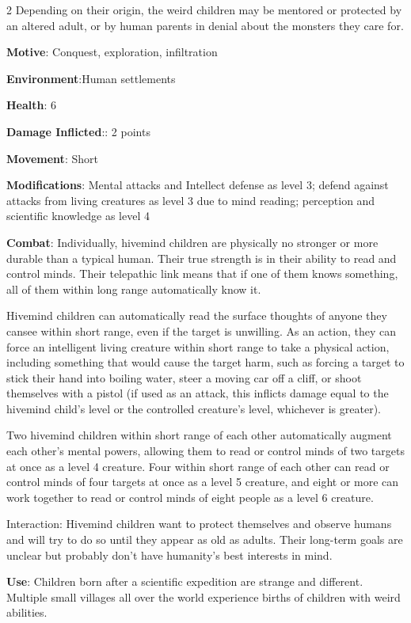 \begin{multicols}{2}
Depending on their origin, the weird children may be mentored or protected by an altered adult, or by human parents in denial about the monsters they care for.

\textbf{Motive}: Conquest, exploration, infiltration

\textbf{Environment}:Human settlements

\textbf{Health}: 6

\textbf{Damage Inflicted}:: 2 points

\textbf{Movement}: Short

\textbf{Modifications}: Mental attacks and Intellect defense as level 3; defend against attacks from living creatures as level 3 due to mind reading; perception and scientific knowledge as level 4

\textbf{Combat}: Individually, hivemind children are physically no stronger or more durable than
a typical human. Their true strength is in their ability to read and control minds. Their telepathic link means that if one of them knows something, all of them within long range automatically know it.

Hivemind children can automatically read the surface thoughts of anyone they cansee within short range, even if the target is unwilling. As an action, they can force an intelligent living creature within short range to take a physical action, including something that would cause the target harm, such as forcing a target to stick their hand into boiling water, steer a moving car off a cliff, or shoot themselves with a pistol (if used as an attack, this inflicts damage equal to the hivemind child’s level or the controlled creature’s level, whichever is greater).

Two hivemind children within short range of each other automatically augment each other’s mental powers, allowing them to read or control minds of two targets at once as a level 4 creature. Four within short range of each other can read or control minds of four targets at once as a level 5 creature, and eight or more can work together to read or control minds of eight people as a level 6 creature.

Interaction: Hivemind children want to protect themselves and observe humans and will try to do so until they appear as old as adults. Their long-term goals are unclear but probably don’t have humanity’s best interests in mind.

\textbf{Use}: Children born after a scientific expedition are strange and different. Multiple small villages all over the world experience births of children with weird abilities.


\end{multicols}

